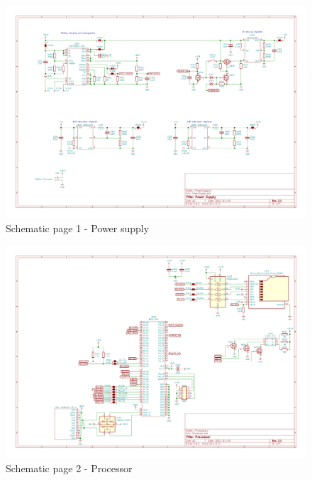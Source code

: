 \begin{landscape}

\begin{figure}[!htb]
\centering
\includegraphics[width=\paperwidth,keepaspectratio]{images/Schematic_PowerSupply.png}
\caption{Schematic page 1 - Power supply}
\label{fig:schematic_power}
\end{figure}

\begin{figure}[!htb]
\centering
\includegraphics[width=\paperwidth,keepaspectratio]{images/Schematic_Processor.png}
\caption{Schematic page 2 - Processor}
\label{fig:schematic_processor}
\end{figure}


\end{landscape}
